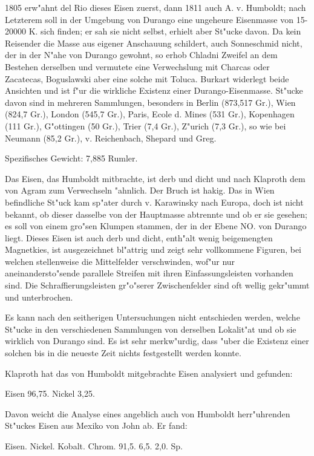 \documentclass[a4paper, 11pt, oneside]{article}
\begin{document}
1805 erw"ahnt del Rio dieses Eisen zuerst, dann 1811 auch A. v. Humboldt; nach Letzterem soll in der Umgebung von Durango eine ungeheure Eisenmasse von 15-20000 K. sich finden; er sah sie nicht selbst, erhielt aber St"ucke davon. Da kein Reisender die Masse aus eigener Anschauung schildert, auch Sonneschmid nicht, der in der N"ahe von Durango gewohnt, so erhob Chladni Zweifel an dem Bestehen derselben und vermutete eine Verwechslung mit Charcas oder Zacatecas, Boguslawski aber eine solche mit Toluca. Burkart widerlegt beide Ansichten und ist f"ur die wirkliche Existenz einer Durango-Eisenmasse. St"ucke davon sind in mehreren Sammlungen, besonders in Berlin (873,517 Gr.), Wien (824,7 Gr.), London (545,7 Gr.), Paris, Ecole d. Mines (531 Gr.), Kopenhagen (111 Gr.), G"ottingen (50 Gr.), Trier (7,4 Gr.), Z"urich (7,3 Gr.), so wie bei Neumann (85,2 Gr.), v. Reichenbach, Shepard und Greg.

Spezifisches Gewicht: 7,885 Rumler.

Das Eisen, das Humboldt mitbrachte, ist derb und dicht und nach Klaproth dem von Agram zum Verwechseln "ahnlich. Der Bruch ist hakig. Das in Wien befindliche St"uck kam sp"ater durch v. Karawinsky nach Europa, doch ist nicht bekannt, ob dieser dasselbe von der Hauptmasse abtrennte und ob er sie gesehen; es soll von einem gro"sen Klumpen stammen, der in der Ebene NO. von Durango liegt. Dieses Eisen ist auch derb und dicht, enth"alt wenig beigemengten Magnetkies, ist ausgezeichnet bl"attrig und zeigt sehr vollkommene Figuren, bei welchen stellenweise die Mittelfelder verschwinden, wof"ur nur aneinandersto"sende parallele Streifen mit ihren Einfassungsleisten vorhanden sind. Die Schraffierungsleisten gr"o"serer Zwischenfelder sind oft wellig gekr"ummt und unterbrochen.

Es kann nach den seitherigen Untersuchungen nicht entschieden werden, welche St"ucke in den verschiedenen Sammlungen von derselben Lokalit"at und ob sie wirklich von Durango sind. Es ist sehr merkw"urdig, dass "uber die Existenz einer solchen bis in die neueste Zeit nichts festgestellt werden konnte.

Klaproth hat das von Humboldt mitgebrachte Eisen analysiert und gefunden:

Eisen 96,75.  
Nickel 3,25.

Davon weicht die Analyse eines angeblich auch von Humboldt herr"uhrenden St"uckes Eisen aus Mexiko von John ab. Er fand:

Eisen. Nickel. Kobalt. Chrom.  
91,5. 6,5. 2,0. Sp.
\end{document}
